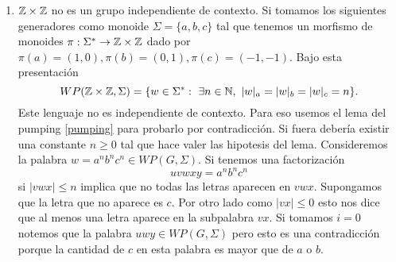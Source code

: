 \documentclass[tesis.tex]{subfiles}
\begin{document}
\begin{ej}
\begin{enumerate}[E1.]
		
		
		\item 	$\mathbb{Z} \times \mathbb{Z}$ no es un grupo independiente de contexto.
		Si tomamos los siguientes generadores como monoide $\Sigma = \{ a,b,c \}$ tal que tenemos un morfismo de monoides $\pi: \Sigma^* \to \mathbb{Z} \times \mathbb{Z}$ dado por $\pi(a)=(1,0), \pi(b)=(0,1), \pi(c)=(-1,-1)$.
		Bajo esta presentación 
		\[
		WP(\mathbb{Z} \times \mathbb{Z}, \Sigma) = \{ w \in \Sigma^*  : \ \exists n \in \mathbb{N}, \ |w|_a = |w|_b = |w|_c = n \}.
		\]
		Este lenguaje no es independiente de contexto.
		Para eso usemos el lema del pumping \ref{pumping} para probarlo por contradicción.
		Si fuera \ic debería existir una constante $n \ge 0$ tal que hace valer las hipotesis del lema.
		Consideremos la palabra $w = a^n b^n c^n \in WP(G, \Sigma)$.
		Si tenemos una factorización 
		\[
		uvwxy = a^nb^nc^n
		\]
		si $|vwx| \le n$ implica que no todas las letras aparecen en $vwx$.
		Supongamos que la letra que no aparece es $c$.
		Por otro lado como $|vx| \le 0$ esto nos dice que al menos una letra aparece en la subpalabra $vx$.
		Si tomamos $i=0$ notemos que la palabra $uwy \in WP(G,\Sigma)$ pero esto es una contradicción porque la cantidad de $c$ en esta palabra es mayor que de $a$ o $b$.
		
	\end{enumerate}
	
\end{ej}
\end{document}
